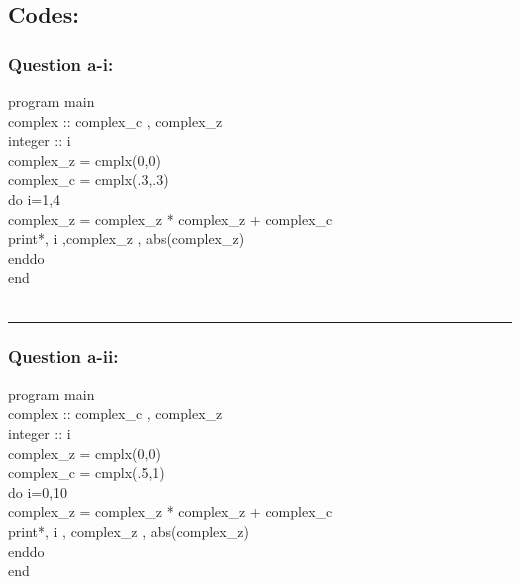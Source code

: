 \documentclass[twocolumn]{article}
\begin{document}

\newpage


\subsection{Codes:}

\subsubsection{Question a-i:\\}\label{[program-i]}
\begin{listing}
\begin{indent}
program main\\
  complex :: complex_c , complex_z \\
  integer :: i\\
  complex_z = cmplx(0,0)\\
  complex_c = cmplx(.3,.3)\\
  do i=1,4\\
    complex_z = complex_z * complex_z + complex_c\\
    print*, i ,complex_z , abs(complex_z)\\
  enddo\\
end\\
\\
\end{indent}
\end{listing}

\noindent\rule{8cm}{0.4pt}
\subsubsection{Question a-ii:\\}\label{[program-ii]}
\begin{listing}
\begin{indent}
program main\\
  complex :: complex_c , complex_z \\
  integer :: i\\
  complex_z = cmplx(0,0)\\
  complex_c = cmplx(.5,1)\\
  do i=0,10\\
    complex_z = complex_z * complex_z + complex_c\\
    print*, i , complex_z , abs(complex_z)\\
  enddo\\
end\\
\end{indent}
\end{listing}
\end{document}
